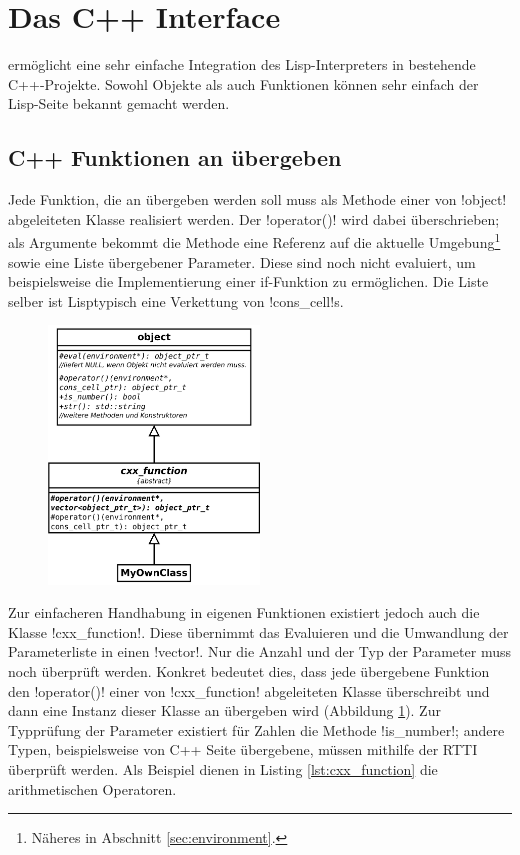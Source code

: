 \section{Das C++ Interface}
\label{sec:cxx_interface}

\projectname{} ermöglicht eine sehr einfache Integration des Lisp-Interpreters in bestehende C++-Projekte. Sowohl Objekte als auch Funktionen können sehr einfach der Lisp-Seite bekannt gemacht werden.

\subsection{C++ Funktionen an \projectname{} übergeben}
\label{sec:cxx_function_interface}

Jede Funktion, die an \projectname{} übergeben werden soll muss als Methode einer von !object! abgeleiteten Klasse realisiert werden. Der !operator()! wird dabei überschrieben; als Argumente bekommt die Methode eine Referenz auf die aktuelle Umgebung\footnote{Näheres in Abschnitt \ref{sec:environment}.} sowie eine Liste übergebener Parameter. Diese sind noch nicht evaluiert, um beispielsweise die Implementierung einer if-Funktion zu ermöglichen. Die Liste selber ist Lisptypisch eine Verkettung von !cons_cell!s. 
\begin{figure}[htbp]
\centering
{}
\includegraphics[width=0.5\textwidth]{images/cxx_interface.pdf}
\label{fig:cxx_interface}
\end{figure}
Zur einfacheren Handhabung in eigenen Funktionen existiert jedoch auch die Klasse !cxx_function!. Diese übernimmt das Evaluieren und die Umwandlung der Parameterliste in einen !vector!. Nur die Anzahl und der Typ der Parameter muss noch überprüft werden. Konkret bedeutet dies, dass jede übergebene Funktion den !operator()! einer von !cxx_function! abgeleiteten Klasse überschreibt und dann eine Instanz dieser Klasse an \projectname{} übergeben wird (Abbildung \ref{fig:cxx_interface}). Zur Typprüfung der Parameter existiert für Zahlen die Methode !is_number!; andere Typen, beispielsweise von C++ Seite übergebene, müssen mithilfe der RTTI überprüft werden. Als Beispiel dienen in Listing \ref{lst:cxx_function} die arithmetischen Operatoren.
